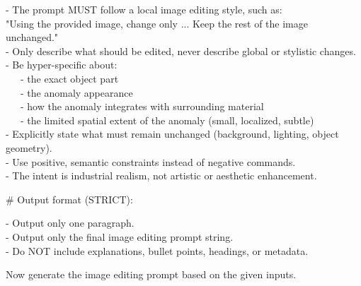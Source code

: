 \documentclass[sigconf]{acmart}
\begin{document}
\begin{tcolorbox}
- The prompt MUST follow a local image editing style, such as: \\
"Using the provided image, change only ... Keep the rest of the image unchanged." \\
- Only describe what should be edited, never describe global or stylistic changes. \\
- Be hyper-specific about: \\
\ \ \ - the exact object part \\
\ \ \ - the anomaly appearance \\
\ \ \ - how the anomaly integrates with surrounding material \\
\ \ \ - the limited spatial extent of the anomaly (small, localized, subtle) \\
- Explicitly state what must remain unchanged (background, lighting, object geometry). \\
- Use positive, semantic constraints instead of negative commands. \\
- The intent is industrial realism, not artistic or aesthetic enhancement.

\vspace{1em}
\# Output format (STRICT):

- Output only one paragraph. \\
- Output only the final image editing prompt string. \\
- Do NOT include explanations, bullet points, headings, or metadata.

\vspace{1em}
Now generate the image editing prompt based on the given inputs.

\end{tcolorbox}


\vspace{1em}
\end{document}
